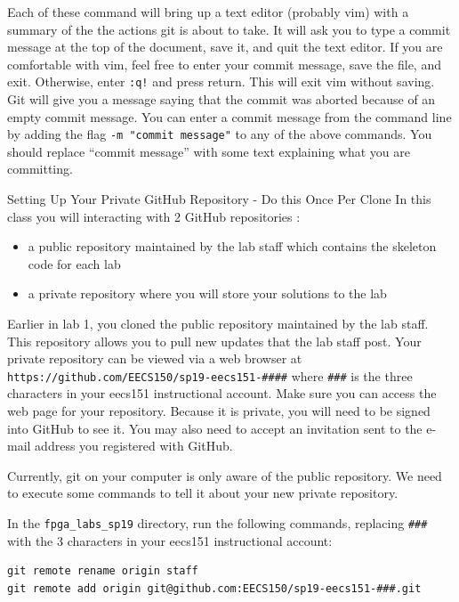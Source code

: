\documentclass[11pt]{article}
\makeatletter
\renewcommand{\subsection}
{\@startsection {subsection}{1}{0pt}
 {-1ex}
 {0.5ex}
 {\bfseries\normalsize}}
\makeatother
\begin{document}
Each of these command will bring up a text editor (probably vim) with a summary of the the actions git is about to take.  It will ask you to type a commit message at the top of the document, save it, and quit the text editor.  If you are comfortable with vim, feel free to enter your commit message, save the file, and exit.  Otherwise, enter \verb|:q!| and press return.  This will exit vim without saving.  Git will give you a message saying that the commit was aborted because of an empty commit message.  You can enter a commit message from the command line by adding the flag \verb|-m "commit message"| to any of the above commands.  You should replace ``commit message'' with some text explaining what you are committing.

\subsection{Setting Up Your Private GitHub Repository - Do this Once Per Clone}
In this class you will interacting with 2 GitHub repositories :
\begin{itemize}
\item a public repository maintained by the lab staff which contains the skeleton code for each lab
\item a private repository where you will store your solutions to the lab
\end{itemize}

Earlier in lab 1, you cloned the public repository maintained by the lab staff.  This repository allows you to pull new updates that the lab staff post.  Your private repository can be viewed via a web browser at \verb|https://github.com/EECS150/sp19-eecs151-####| where \verb|###| is the three characters in your eecs151 instructional account.  Make sure you can access the web page for your repository.  Because it is private, you will need to be signed into GitHub to see it.  You may also need to accept an invitation sent to the e-mail address you registered with GitHub.

Currently, git on your computer is only aware of the public repository.  We need to execute some commands to tell it about your new private repository.

In the \verb|fpga_labs_sp19| directory, run the following commands, replacing \verb|###| with the 3 characters in your eecs151 instructional account:
\begin{verbatim}
git remote rename origin staff
git remote add origin git@github.com:EECS150/sp19-eecs151-###.git
\end{verbatim}
\end{document}

